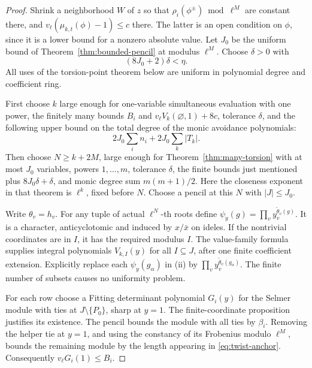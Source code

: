\documentclass[11pt,a4paper]{article}
\theoremstyle{definition}
\begin{document}
\begin{proof}
Shrink a neighborhood \(W\) of \(z\) so that
\(\rho_i(\phi^\pm)\bmod\ell^M\) are constant there,
and \(v_\ell(\mu_{k,t}(\phi)-1)\le c\) there.
The latter is an open condition on \(\phi\), since
it is a lower bound for a nonzero absolute value.
Let \(J_0\) be the uniform bound of
Theorem~\ref{thm:bounded-pencil} at modulus \(\ell^M\).
Choose \(\delta>0\) with
\begin{equation}\label{eq:delta-twist}
 (8J_0+2)\delta<\eta.
\end{equation}
All uses of the torsion-point theorem below are
uniform in polynomial degree and coefficient ring.

First choose \(k\) large enough for one-variable
simultaneous evaluation with one power, the
finitely many bounds \(B_i\) and
\(v_\ell V_k(\varnothing,1)+8c\), tolerance
\(\delta\), and the following upper bound on the
total degree of the monic avoidance polynomials:
\[
 2J_0\sum_i n_i+2J_0\sum_k|T_k|.
\]
Then choose \(N\ge k+2M\), large enough for
Theorem~\ref{thm:many-torsion} with at most \(J_0\)
variables, powers \(1,\ldots,m\), tolerance \(\delta\),
the finite bounds just mentioned plus \(8J_0\delta+\delta\),
and monic degree sum \(m(m+1)/2\).
Here the closeness exponent in that theorem is
\(\ell^k\), fixed before \(N\).
Choose a pencil at this \(N\) with \(|J|\le J_0\).

Write \(\theta_v=h_v\).
For any tuple of actual \(\ell^N\)-th roots define
\(\psi_y(g)=\prod_v y_v^{\widetilde\theta_v(g)}\).
It is a character, anticyclotomic and induced by
\(x/\bar x\) on ideles. If the nontrivial coordinates
are in \(I\), it has the required modulus \(I\).
The value-family formula supplies integral
polynomials \(V_{k,I}(y)\) for all \(I\subseteq J\),
after one finite coefficient extension. Explicitly
replace each \(\psi_y(g_\alpha)\) in (ii) by
\(\prod_v y_v^{\widetilde\theta_v(g_\alpha)}\).
The finite number of subsets causes no uniformity
problem.

For each row choose a Fitting determinant polynomial
\(G_i(y)\) for the Selmer module with ties at
\(J\setminus\{P_0\}\), sharp at \(y=1\).
The finite-coordinate proposition justifies its
existence. The pencil bounds the module with all
ties by \(\beta_i\). Removing the helper tie at
\(y=1\), and using the constancy of its Frobenius
modulo \(\ell^M\), bounds the remaining module
by the length appearing in
\eqref{eq:twist-anchor}.
Consequently \(v_\ell G_i(1)\le B_i\).


\end{proof}
\end{document}
